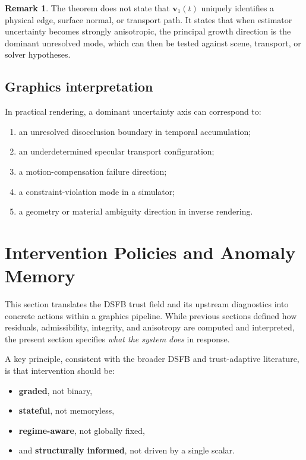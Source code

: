 \documentclass[11pt]{article}
\theoremstyle{definition}
\newtheorem{remark}[definition]{Remark}
\theoremstyle{plain}
\begin{document}
\begin{remark}
The theorem does not state that $\mathbf{v}_1(t)$ uniquely identifies a physical edge, surface normal, or transport path. It states that when estimator uncertainty becomes strongly anisotropic, the principal growth direction is the dominant unresolved mode, which can then be tested against scene, transport, or solver hypotheses.
\end{remark}

\subsection{Graphics interpretation}
In practical rendering, a dominant uncertainty axis can correspond to:
\begin{enumerate}[leftmargin=2em]
    \item an unresolved disocclusion boundary in temporal accumulation;
    \item an underdetermined specular transport configuration;
    \item a motion-compensation failure direction;
    \item a constraint-violation mode in a simulator;
    \item a geometry or material ambiguity direction in inverse rendering.
\end{enumerate}



\section{Intervention Policies and Anomaly Memory}
\label{sec:intervention}

This section translates the DSFB trust field and its upstream diagnostics into concrete actions within a graphics pipeline. While previous sections defined how residuals, admissibility, integrity, and anisotropy are computed and interpreted, the present section specifies \emph{what the system does} in response.

A key principle, consistent with the broader DSFB and trust-adaptive literature, is that intervention should be:
\begin{itemize}[leftmargin=1.5em]
    \item \textbf{graded}, not binary,
    \item \textbf{stateful}, not memoryless,
    \item \textbf{regime-aware}, not globally fixed,
    \item and \textbf{structurally informed}, not driven by a single scalar.
\end{itemize}
\end{document}
